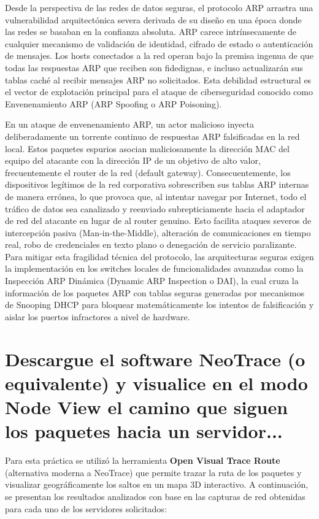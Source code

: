\documentclass[a4paper,12pt]{article}
\begin{document}
Desde la perspectiva de las redes de datos seguras, el protocolo ARP arrastra una vulnerabilidad arquitectónica severa derivada de su diseño en una época donde las redes se basaban en la confianza absoluta. ARP carece intrínsecamente de cualquier mecanismo de validación de identidad, cifrado de estado o autenticación de mensajes. Los hosts conectados a la red operan bajo la premisa ingenua de que todas las respuestas ARP que reciben son fidedignas, e incluso actualizarán sus tablas caché al recibir mensajes ARP no solicitados. Esta debilidad estructural es el vector de explotación principal para el ataque de ciberseguridad conocido como Envenenamiento ARP (ARP Spoofing o ARP Poisoning). 

En un ataque de envenenamiento ARP, un actor malicioso inyecta deliberadamente un torrente continuo de respuestas ARP falsificadas en la red local. Estos paquetes espurios asocian maliciosamente la dirección MAC del equipo del atacante con la dirección IP de un objetivo de alto valor, frecuentemente el router de la red (default gateway). Consecuentemente, los dispositivos legítimos de la red corporativa sobrescriben sus tablas ARP internas de manera errónea, lo que provoca que, al intentar navegar por Internet, todo el tráfico de datos sea canalizado y reenviado subrepticiamente hacia el adaptador de red del atacante en lugar de al router genuino. Esto facilita ataques severos de intercepción pasiva (Man-in-the-Middle), alteración de comunicaciones en tiempo real, robo de credenciales en texto plano o denegación de servicio paralizante. Para mitigar esta fragilidad técnica del protocolo, las arquitecturas seguras exigen la implementación en los switches locales de funcionalidades avanzadas como la Inspección ARP Dinámica (Dynamic ARP Inspection o DAI), la cual cruza la información de los paquetes ARP con tablas seguras generadas por mecanismos de Snooping DHCP para bloquear matemáticamente los intentos de falsificación y aislar los puertos infractores a nivel de hardware.

\newpage

\section{Descargue el software NeoTrace (o equivalente) y visualice en el modo Node View el camino que siguen los paquetes hacia un servidor...}

Para esta práctica se utilizó la herramienta \textbf{Open Visual Trace Route} (alternativa moderna a NeoTrace) que permite trazar la ruta de los paquetes y visualizar geográficamente los saltos en un mapa 3D interactivo. A continuación, se presentan los resultados analizados con base en las capturas de red obtenidas para cada uno de los servidores solicitados:
\end{document}
